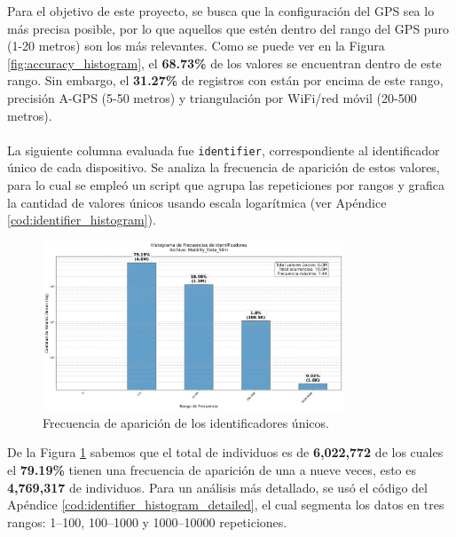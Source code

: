 Para el objetivo de este proyecto, se busca que la configuración del GPS sea lo más precisa posible, por lo que aquellos que estén dentro del rango del GPS puro (1-20 metros) son los más relevantes. Como se puede ver en la Figura \ref{fig:accuracy_histogram}, el \textbf{68.73\%} de los valores se encuentran dentro de este rango. Sin embargo, el \textbf{31.27\%} de registros con están por encima de este rango, precisión A-GPS (5-50 metros) y triangulación por WiFi/red móvil (20-500 metros).\\
\\
La siguiente columna evaluada fue \texttt{identifier}, correspondiente al identificador único de cada dispositivo. Se analiza la frecuencia de aparición de estos valores, para lo cual se empleó un script que agrupa las repeticiones por rangos y grafica la cantidad de valores únicos usando escala logarítmica (ver Apéndice \ref{cod:identifier_histogram}).

\begin{figure}[H]
    \centering
    \includegraphics[width=0.8\textwidth]{img/histograma_identifier_Mobility_Data_Slim.png}
    \caption{Frecuencia de aparición de los identificadores únicos.}
    \label{fig:identifier_histogram}
\end{figure}

De la Figura \ref{fig:identifier_histogram} sabemos que el total de individuos es de \textbf{6,022,772} de los cuales el \textbf{79.19\%} tienen una frecuencia de aparición de una a nueve veces, esto es \textbf{4,769,317} de individuos. Para un análisis más detallado, se usó el código del Apéndice \ref{cod:identifier_histogram_detailed}, el cual segmenta los datos en tres rangos: 1–100, 100–1000 y 1000–10000 repeticiones.

